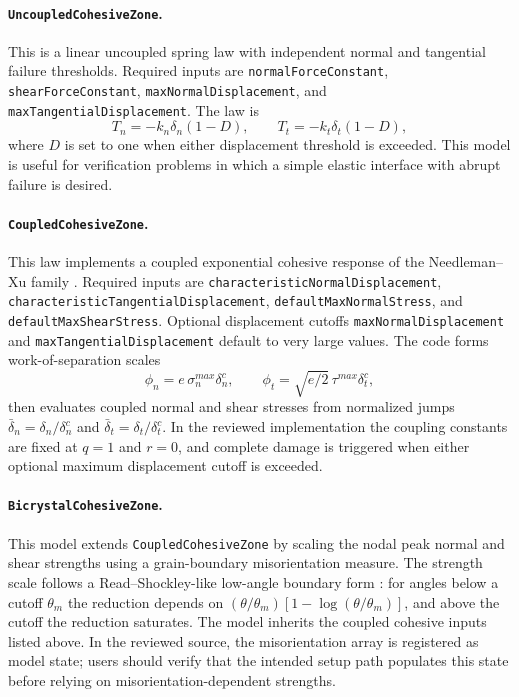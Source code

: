 \paragraph{\texttt{UncoupledCohesiveZone}.}
This is a linear uncoupled spring law with independent normal and tangential failure thresholds.  Required inputs are \texttt{normalForceConstant}, \texttt{shearForceConstant}, \texttt{maxNormalDisplacement}, and \texttt{maxTangentialDisplacement}.  The law is
\begin{equation}
  T_n=-k_n\delta_n(1-D),
  \qquad
  T_t=-k_t\delta_t(1-D),
  \label{eq:cz-uncoupled}
\end{equation}
where $D$ is set to one when either displacement threshold is exceeded.  This model is useful for verification problems in which a simple elastic interface with abrupt failure is desired.

\paragraph{\texttt{CoupledCohesiveZone}.}
This law implements a coupled exponential cohesive response of the Needleman--Xu family \cite{xuneedleman1994}.  Required inputs are \texttt{characteristicNormalDisplacement}, \texttt{characteristicTangentialDisplacement}, \texttt{defaultMaxNormalStress}, and \texttt{defaultMaxShearStress}.  Optional displacement cutoffs \texttt{maxNormalDisplacement} and \texttt{maxTangentialDisplacement} default to very large values.  The code forms work-of-separation scales
\begin{equation}
  \phi_n = e\,\sigma^{max}_n\delta^c_n,
  \qquad
  \phi_t = \sqrt{e/2}\,\tau^{max}\delta^c_t,
  \label{eq:cz-coupled-work}
\end{equation}
then evaluates coupled normal and shear stresses from normalized jumps $\bar{\delta}_n=\delta_n/\delta^c_n$ and $\bar{\delta}_t=\delta_t/\delta^c_t$.  In the reviewed implementation the coupling constants are fixed at $q=1$ and $r=0$, and complete damage is triggered when either optional maximum displacement cutoff is exceeded.

\paragraph{\texttt{BicrystalCohesiveZone}.}
This model extends \texttt{CoupledCohesiveZone} by scaling the nodal peak normal and shear strengths using a grain-boundary misorientation measure.  The strength scale follows a Read--Shockley-like low-angle boundary form \cite{readshockley1950}: for angles below a cutoff $\theta_m$ the reduction depends on $(\theta/\theta_m)\left[1-\log(\theta/\theta_m)\right]$, and above the cutoff the reduction saturates.  The model inherits the coupled cohesive inputs listed above.  In the reviewed source, the misorientation array is registered as model state; users should verify that the intended setup path populates this state before relying on misorientation-dependent strengths.

